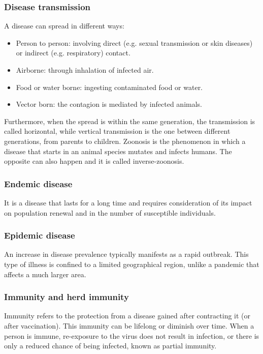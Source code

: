 \subsubsection{Disease transmission} A disease can spread in different ways: 
	\begin{itemize}
		\item Person to person: involving direct (e.g. sexual transmission or skin diseases) or indirect (e.g. respiratory) contact.
		\item Airborne: through inhalation of infected air.
		\item Food or water borne: ingesting contaminated food or water. 
		\item Vector born: the contagion is mediated by infected animals.
	\end{itemize}
	Furthermore, when the spread is within the same generation, the transmission is called horizontal, while vertical transmission is the one between different generations, from parents to children. 
	Zoonosis is the phenomenon in which a disease that starts in an animal species mutates and infects humans. The opposite can also happen and it is called inverse-zoonosis. 

\subsubsection{Endemic disease} It is a disease that lasts for a long time and requires consideration of its impact on population renewal and in the number of susceptible individuals.
	
\subsubsection{Epidemic disease} An increase in disease prevalence typically manifests as a rapid outbreak. This type of illness is confined to a limited geographical region, unlike a pandemic that affects a much larger area.

\subsubsection{Immunity and herd immunity}
Immunity refers to the protection from a disease gained after contracting it (or after vaccination). This immunity can be lifelong or diminish over time. When a person is immune, re-exposure to the virus does not result in infection, or there is only a reduced chance of being infected, known as partial immunity.

